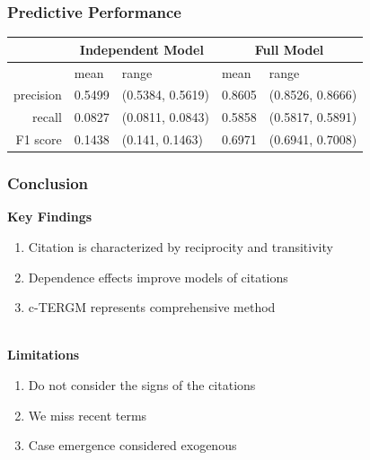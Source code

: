 \documentclass[handout]{beamer}
\begin{document}
\begin{frame} \frametitle{Predictive Performance}

\begin{tabular}{rllll}
\hline \hline
& \multicolumn{2}{c}{Independent Model} & \multicolumn{2}{c}{Full Model} \\
  \hline
 & mean & range & mean & range \\ 
  \hline
precision & 0.5499 & (0.5384, 0.5619) & 0.8605 & (0.8526, 0.8666) \\ 
  recall & 0.0827 & (0.0811, 0.0843) & 0.5858 & (0.5817, 0.5891) \\ 
  F1 score & 0.1438 & (0.141, 0.1463) & 0.6971 & (0.6941, 0.7008) \\ 
   \hline \hline
\end{tabular}

\end{frame}

\begin{frame} \frametitle{Conclusion}

{\bf Key Findings}
\begin{enumerate}
\item Citation is characterized by reciprocity and transitivity
\item Dependence effects improve models of citations
\item c-TERGM represents comprehensive method
\end{enumerate}
~\\
{\bf Limitations}
\begin{enumerate}
\item Do not consider the signs of the citations
\item We miss recent terms
\item Case emergence considered exogenous
\end{enumerate}


\end{frame}
\end{document}
